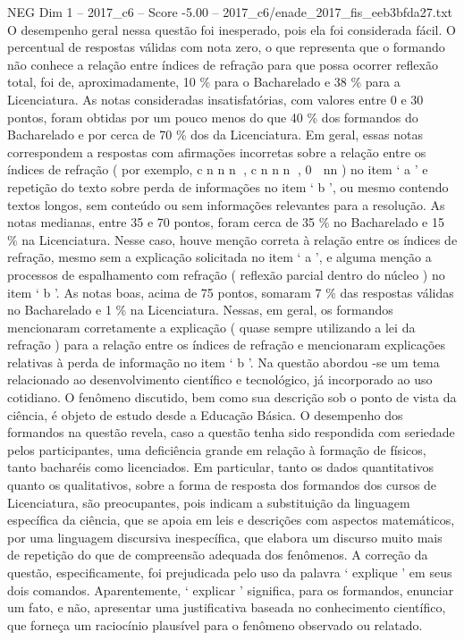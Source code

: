\begin{textsample}{NEG Dim 1 – 2017\_c6 – Score -5.00 – 2017\_c6/enade\_2017\_fis\_eeb3bfda27.txt}
O desempenho geral nessa questão foi inesperado, pois ela foi considerada fácil.
O percentual de respostas válidas com nota zero, o que representa que o formando não conhece a relação entre índices de refração para que possa ocorrer reflexão total, foi de, aproximadamente, 10 \% para o Bacharelado e 38 \% para a Licenciatura.
As notas consideradas insatisfatórias, com valores entre 0 e 30 pontos, foram obtidas por um pouco menos do que 40 \% dos formandos do Bacharelado e por cerca de 70 \% dos da Licenciatura.
Em geral, essas notas correspondem a respostas com afirmações incorretas sobre a relação entre os índices de refração ( por exemplo, c n n n , c n n n , 0  nn ) no item ‘ a ’ e repetição do texto sobre perda de informações no item ‘ b ’, ou mesmo contendo textos longos, sem conteúdo ou sem informações relevantes para a resolução.
As notas medianas, entre 35 e 70 pontos, foram cerca de 35 \% no Bacharelado e 15 \% na Licenciatura.
Nesse caso, houve menção correta à relação entre os índices de refração, mesmo sem a explicação solicitada no item ‘ a ’, e alguma menção a processos de espalhamento com refração ( reflexão parcial dentro do núcleo ) no item ‘ b ’.
As notas boas, acima de 75 pontos, somaram 7 \% das respostas válidas no Bacharelado e 1 \% na Licenciatura.
Nessas, em geral, os formandos mencionaram corretamente a explicação ( quase sempre utilizando a lei da refração ) para a relação entre os índices de refração e mencionaram explicações relativas à perda de informação no item ‘ b ’.
Na questão abordou -se um tema relacionado ao desenvolvimento científico e tecnológico, já incorporado ao uso cotidiano.
O fenômeno discutido, bem como sua descrição sob o ponto de vista da ciência, é objeto de estudo desde a Educação Básica.
O desempenho dos formandos na questão revela, caso a questão tenha sido respondida com seriedade pelos participantes, uma deficiência grande em relação à formação de físicos, tanto bacharéis como licenciados.
Em particular, tanto os dados quantitativos quanto os qualitativos, sobre a forma de resposta dos formandos dos cursos de Licenciatura, são preocupantes, pois indicam a substituição da linguagem específica da ciência, que se apoia em leis e descrições com aspectos matemáticos, por uma linguagem discursiva inespecífica, que elabora um discurso muito mais de repetição do que de compreensão adequada dos fenômenos.
A correção da questão, especificamente, foi prejudicada pelo uso da palavra ‘ explique ’ em seus dois comandos.
Aparentemente, ‘ explicar ’ significa, para os formandos, enunciar um fato, e não, apresentar uma justificativa baseada no conhecimento científico, que forneça um raciocínio plausível para o fenômeno observado ou relatado.

\end{textsample}
